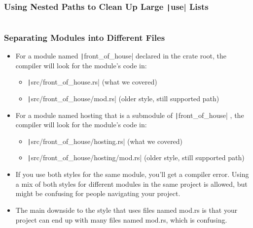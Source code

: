 \documentclass{beamer}
\begin{document}
\begin{frame}[fragile]
	\frametitle{Using Nested Paths to Clean Up Large \texttt|use| Lists}
	\inputminted{rust}{./code/module14.rs}
\end{frame}


\begin{frame}[fragile]
	\frametitle{Separating Modules into Different Files}
	\begin{itemize}
		\item For a module named  \texttt|front_of_house| declared in the crate root, the compiler will look for the module’s code in:
		\begin{itemize}
			\item \texttt|src/front_of_house.rs| (what we covered)
			\item 	\texttt|src/front_of_house/mod.rs| (older style, still supported path)
		\end{itemize}
		\item 	For a module named hosting that is a submodule of \texttt|front_of_house| , the compiler will look for the module’s code in:
		\begin{itemize}
			\item \texttt|src/front_of_house/hosting.rs| (what we covered)
			\item 	\texttt|src/front_of_house/hosting/mod.rs| (older style, still supported path)
		\end{itemize}
		\item 	If you use both styles for the same module, you’ll get a compiler error. Using a mix of both styles for different modules in the same project is allowed, but might be confusing for people navigating your project.
		\item The main downside to the style that uses files named mod.rs is that your project can end up with many files named mod.rs, which is confusing.
	\end{itemize}
	
\end{frame}
\end{document}
